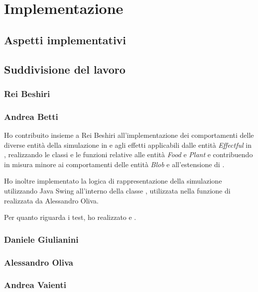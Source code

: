 \section{Implementazione}
\subsection{Aspetti implementativi}

\subsection{Suddivisione del lavoro}
\subsubsection{Rei Beshiri}

\subsubsection{Andrea Betti}
Ho contribuito insieme a Rei Beshiri all'implementazione dei comportamenti delle diverse entità della simulazione in  e agli effetti applicabili dalle entità \textit{Effectful} in , realizzando le classi e le funzioni relative alle entità \textit{Food} e \textit{Plant} e contribuendo in misura minore ai comportamenti delle entità \textit{Blob} e all'estensione di .

Ho inoltre implementato la logica di rappresentazione della simulazione utilizzando Java Swing all'interno della classe , utilizzata nella funzione  di  realizzata da Alessandro Oliva.

Per quanto riguarda i test, ho realizzato  e .
\subsubsection{Daniele Giulianini}

\subsubsection{Alessandro Oliva}

\subsubsection{Andrea Vaienti}